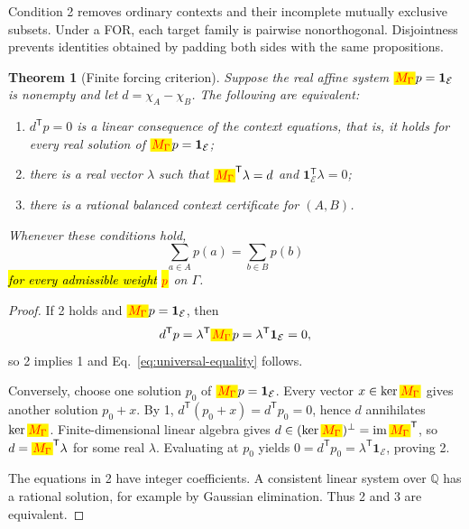 \documentclass[
  twocolumn,
  aps,
  pra,
  floatfix,
  amsmath,amssymb,
  longbibliography
]{revtex4-2}
\newtheorem{theorem}{Theorem}
\theoremstyle{definition}
\theoremstyle{remark}
\newcommand{\E}{\mathcal E}
\newcommand{\one}{\mathbf 1}
\newcommand{\corr}[1]{{\color{red}\hl{#1}}}
\newcommand{\corrmath}[1]{\begingroup\setlength{\fboxsep}{1pt}\colorbox{yellow}{\ensuremath{\color{red}#1}}\endgroup}
\begin{document}
Condition 2 removes ordinary contexts and their incomplete mutually
exclusive subsets.  Under a FOR, each target family is
pairwise nonorthogonal.  Disjointness prevents identities obtained by padding
both sides with the same propositions.

\begin{theorem}[Finite forcing criterion]
\label{thm:forcing}
Suppose the real affine system $\corrmath{M_\Gamma}p=\one_\E$ is nonempty and let
$d=\chi_A-\chi_B$.  The following are equivalent:
\begin{enumerate}
  \item $d^{\mathsf T}p=0$ is a linear consequence of the context equations,
        that is, it holds for every real solution of
        $\corrmath{M_\Gamma}p=\one_\E$;
  \item there is a real vector $\lambda$ such that
        $\corrmath{M_\Gamma}^{\mathsf T}\lambda=d$ and
        $\one_\E^{\mathsf T}\lambda=0$;
  \item there is a rational balanced context certificate for $(A,B)$.
\end{enumerate}
Whenever these conditions hold,
\begin{equation}
  \sum_{a\in A}p(a)=\sum_{b\in B}p(b)
  \label{eq:universal-equality}
\end{equation}
\corr{for every admissible weight} \corrmath{p}
on $\Gamma$.
\end{theorem}

\begin{proof}
If 2 holds and $\corrmath{M_\Gamma}p=\one_\E$, then
\[
 d^{\mathsf T}p
 =\lambda^{\mathsf T}\corrmath{M_\Gamma}p
 =\lambda^{\mathsf T}\one_\E
 =0,
\]
so 2 implies 1 and Eq.~\eqref{eq:universal-equality} follows.

Conversely, choose one solution $p_0$ of $\corrmath{M_\Gamma}p=\one_\E$.  Every vector
$x\in\ker \corrmath{M_\Gamma}$ gives another solution $p_0+x$.  By 1,
$d^{\mathsf T}(p_0+x)=d^{\mathsf T}p_0=0$, hence $d$ annihilates
$\ker \corrmath{M_\Gamma}$.  Finite-dimensional linear algebra gives
$d\in(\ker \corrmath{M_\Gamma})^\perp=\operatorname{im}\corrmath{M_\Gamma}^{\mathsf T}$, so
$d=\corrmath{M_\Gamma}^{\mathsf T}\lambda$ for some real $\lambda$.  Evaluating at $p_0$
yields
$0=d^{\mathsf T}p_0=\lambda^{\mathsf T}\one_\E$, proving 2.

The equations in 2 have integer coefficients.  A consistent linear system
over $\mathbb Q$ has a rational solution, for example by Gaussian
elimination.  Thus 2 and 3 are equivalent.
\end{proof}
\end{document}
